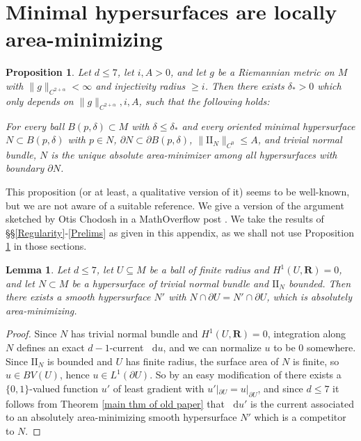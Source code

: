 \documentclass[reqno,11pt]{amsart}
\newcommand{\RR}{\mathbf{R}}
\newcommand*\dif{\mathop{}\!\mathrm{d}}
\newcommand{\Two}{\mathrm{I\!I}}
\newtheorem{lemma}[theorem]{Lemma}
\newtheorem{proposition}[theorem]{Proposition}
\theoremstyle{definition}
\numberwithin{equation}{section}
\begin{document}
\section{Minimal hypersurfaces are locally area-minimizing} \label{locally minimizing appendix}
\begin{proposition}\label{minimal implies locally minimizing}
Let $d \leq 7$, let $i, A > 0$, and let $g$ be a Riemannian metric on $M$ with $\|g\|_{C^{2 + \alpha}} < \infty$ and injectivity radius $\geq i$.
Then there exists $\delta_* > 0$ which only depends on $\|g\|_{C^{2 + \alpha}}, i, A$, such that the following holds:

For every ball $B(p, \delta) \subset M$ with $\delta \leq \delta_*$ and every oriented minimal hypersurface $N \subset B(p, \delta)$ with $p \in N$, $\partial N \subset \partial B(p, \delta)$, $\|\Two_N\|_{C^0} \leq A$, and trivial normal bundle, $N$ is the unique absolute area-minimizer among all hypersurfaces with boundary $\partial N$.
\end{proposition}

This proposition (or at least, a qualitative version of it) seems to be well-known, but we are not aware of a suitable reference.
We give a version of the argument sketched by Otis Chodosh in a MathOverflow post \cite{MathOverflowMinimalLocal}.
We take the results of \S\S\ref{Regularity}-\ref{Prelims} as given in this appendix, as we shall not use Proposition \ref{minimal implies locally minimizing} in those sections.

\begin{lemma}\label{existence of absolute minimizers}
Let $d \leq 7$, let $U \subseteq M$ be a ball of finite radius and $H^1(U, \RR) = 0$, and let $N \subset M$ be a hypersurface of trivial normal bundle and $\Two_N$ bounded.
Then there exists a smooth hypersurface $N'$ with $N \cap \partial U = N' \cap \partial U$, which is absolutely area-minimizing.
\end{lemma}
\begin{proof}
Since $N$ has trivial normal bundle and $H^1(U, \RR) = 0$, integration along $N$ defines an exact $d - 1$-current $\dif u$, and we can normalize $u$ to be $0$ somewhere.
Since $\Two_N$ is bounded and $U$ has finite radius, the surface area of $N$ is finite, so $u \in BV(U)$, hence $u \in L^1(\partial U)$.
So by an easy modification of \cite[Theorem 1.20]{Giusti77} there exists a $\{0, 1\}$-valued function $u'$ of least gradient with $u'|_{\partial U} = u|_{\partial U}$, and since $d \leq 7$ it follows from Theorem \ref{main thm of old paper} that $\dif u'$ is the current associated to an absolutely area-minimizing smooth hypersurface $N'$ which is a competitor to $N$.
\end{proof}
\end{document}
